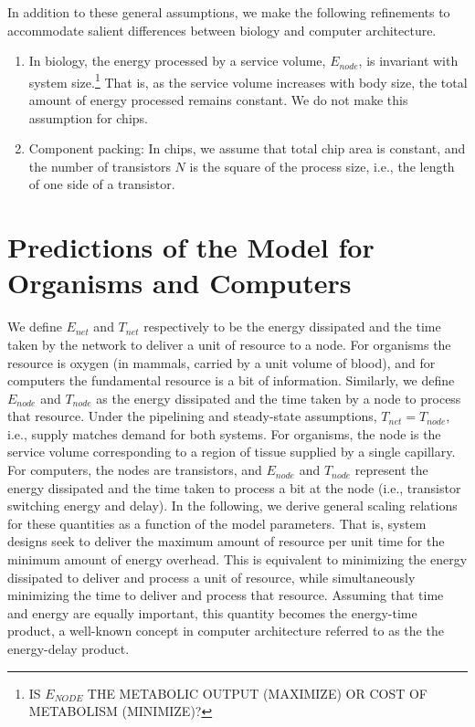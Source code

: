 \documentclass[12pt]{article}
\begin{document}
In addition to these general assumptions, we make the following
refinements to accommodate salient differences between biology and computer architecture.
\begin{enumerate}
\item In biology, the energy processed by a service volume,
  $E_{node}$, is invariant with system size.\footnote{IS $E_{NODE}$ THE METABOLIC OUTPUT (MAXIMIZE) OR COST OF METABOLISM
  (MINIMIZE)?}  That is, as the service volume
  increases with body size, the total amount of energy processed
  remains constant.   We do not make this assumption for chips.

\item Component packing: In chips, we assume that total chip area is constant, and the
  number of transistors $N$ is the square of the process size, i.e.,
  the length of one side of a transistor. 

\end{enumerate}



\section{Predictions of the Model for Organisms and Computers}

We define $E_{net}$ and $T_{net}$ respectively to be the energy dissipated and the 
time taken by the network to deliver a unit of resource to a node.  
For organisms the resource is oxygen (in mammals, carried by a unit volume of blood), and for computers
the fundamental resource is a bit of information.  
Similarly, we define $E_{node}$ and $T_{node}$ as the 
energy dissipated and the time taken by a node to process that resource.
Under the
pipelining and steady-state assumptions, $T_{net} = T_{node}$, i.e.,
supply matches demand for both systems.
For organisms, the node is the service volume 
corresponding to a region of tissue supplied by a single capillary.  
For computers, the nodes are transistors, and 
$E_{node}$ and $T_{node}$ represent the energy dissipated and 
the time taken to process a bit at the node (i.e., transistor 
switching energy and delay).  In the following, we derive general 
scaling relations for these quantities as a function of the model 
parameters.  That is, system designs seek to deliver the maximum amount of resource per unit time for 
the minimum amount of energy overhead.   This is equivalent to minimizing the energy dissipated to deliver and process a unit of resource, while simultaneously minimizing the time to deliver and process that resource.  Assuming that time and energy are
equally important, this quantity becomes the energy-time product, 
a well-known concept in computer architecture referred to as the
the energy-delay product.  
\end{document}

